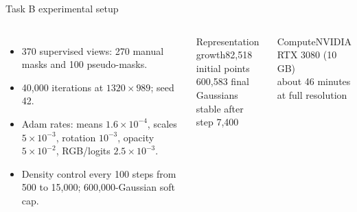 \documentclass[aspectratio=169,10pt]{beamer}
\begin{document}
\begin{frame}{Task B experimental setup}
\begin{columns}[T,onlytextwidth]\begin{itemize}\tightitems
\item 370 supervised views: 270 manual masks and 100 pseudo-masks.
\item 40,000 iterations at $1320\times989$; seed 42.
\item Adam rates: means $1.6\times10^{-4}$, scales $5\times10^{-3}$, rotation $10^{-3}$, opacity $5\times10^{-2}$, RGB/logits $2.5\times10^{-3}$.
\item Density control every 100 steps from 500 to 15,000; 600,000-Gaussian soft cap.
\end{itemize}
\begin{block}{Representation growth}82,518 initial points\\600,583 final Gaussians\\stable after step 7,400\end{block}
\begin{block}{Compute}NVIDIA RTX 3080 (10 GB)\\about 46 minutes at full resolution\end{block}\end{columns}
\end{frame}
\end{document}
